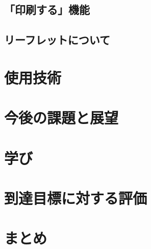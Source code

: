 \documentclass[openany,11pt,papersize]{jsbook}
\begin{document}
\section{「印刷する」機能}

\section{リーフレットについて}


\chapter{使用技術}







\chapter{今後の課題と展望}



\chapter{学び}





\chapter{到達目標に対する評価}


\chapter{まとめ}

\end{document}
